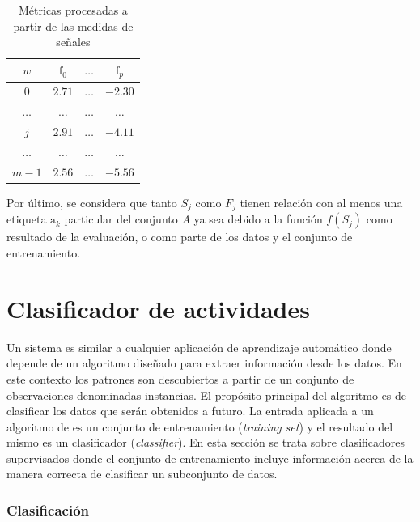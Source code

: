 \begin{table}[!tbph]
\begin{centering}
\begin{tabular}{|c|c|c|c|}
\hline 
$w$ & $\mathrm{f}_{0}$ & $\ldots$ & $\mathrm{f}_{p}$\tabularnewline
\hline 
\hline 
$0$ & $2.71$ & \texttt{$\ldots$} & \texttt{$-2.30$}\tabularnewline
\hline 
$\ldots$ & $\ldots$ & \texttt{$\ldots$} & \texttt{$\ldots$}\tabularnewline
\hline 
$j$ & $2.91$ & \texttt{$\ldots$} & \texttt{$-4.11$}\tabularnewline
\hline 
$\ldots$ & $\ldots$ & \texttt{$\ldots$} & \texttt{$\ldots$}\tabularnewline
\hline 
$m-1$ & $2.56$ & \texttt{$\ldots$} & \texttt{$-5.56$}\tabularnewline
\hline 
\end{tabular}
\par\end{centering}
\caption[Métricas de proceso de extracción]{\label{tab4:features}Métricas procesadas a partir de las medidas
de señales}
\end{table}

Por último, se considera que tanto $S_{j}$ como $F_{j\ensuremath{}}$
tienen relación con al menos una etiqueta $\mathrm{a}_{k}$ particular
del conjunto $A$ ya sea debido a la función $f(S_{j})$ como resultado
de la evaluación, o como parte de los datos y el conjunto de entrenamiento.

\section{Clasificador de actividades }

\label{sec45:clasificador}Un sistema  es similar a cualquier
aplicación de aprendizaje automático  donde depende de un
algoritmo diseñado para extraer información desde los datos. En este
contexto los patrones son descubiertos a partir de un conjunto de
observaciones denominadas instancias\cite{LaraLabrador2013}. El propósito
principal del algoritmo es de clasificar los datos que serán obtenidos
a futuro. La entrada aplicada a un algoritmo de  es un conjunto
de entrenamiento (\emph{training set}) y el resultado del mismo es
un clasificador (\emph{classifier})\cite{Rajaraman2011}. En esta
sección se trata sobre clasificadores supervisados donde el conjunto
de entrenamiento incluye información acerca de la manera correcta
de clasificar un subconjunto de datos.

\subsubsection{Clasificación}

